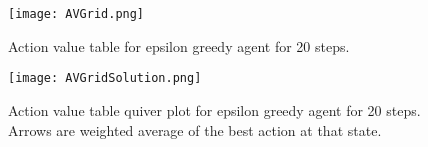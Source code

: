 
\begin{figure}[h]
\texttt{[image: AVGrid.png]}
\caption{Action value table for epsilon greedy agent for 20 steps.}
\label{fig:AVGrid}
\end{figure}

\begin{figure}[h]
\texttt{[image: AVGridSolution.png]}
\caption{Action value table quiver plot for epsilon greedy agent for 20 steps.  Arrows are weighted average of the best action at that state.}
\label{fig:AVGridSolution}
\end{figure}